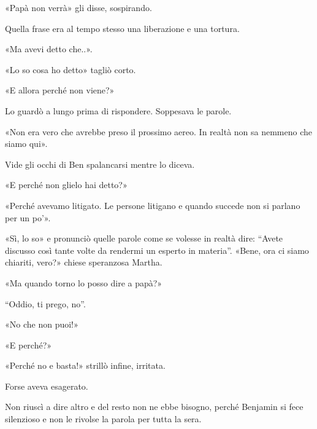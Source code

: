 «Papà non verrà» gli disse, sospirando.

Quella frase era al tempo stesso una liberazione e una tortura.

«Ma avevi detto che..».

«Lo so cosa ho detto» tagliò corto.

«E allora perché non viene?»

Lo guardò a lungo prima di rispondere. Soppesava le parole.

«Non era vero che avrebbe preso il prossimo aereo. In realtà non sa nemmeno che siamo qui».

Vide gli occhi di Ben spalancarsi mentre lo diceva.

«E perché non glielo hai detto?»

«Perché avevamo litigato. Le persone litigano e quando succede non si parlano per un po'».

«Sì, lo so» e pronunciò quelle parole come se volesse in realtà dire: ``Avete discusso così tante
volte da rendermi un esperto in materia''. «Bene, ora ci siamo chiariti, vero?» chiese speranzosa
Martha.

«Ma quando torno lo posso dire a papà?»

``Oddio, ti prego, no''.

«No che non puoi!»

«E perché?»

«Perché no e basta!» strillò infine, irritata.

Forse aveva esagerato.

Non riuscì a dire altro e del resto non ne ebbe bisogno, perché Benjamin si fece silenzioso e non le
rivolse la parola per tutta la sera.

